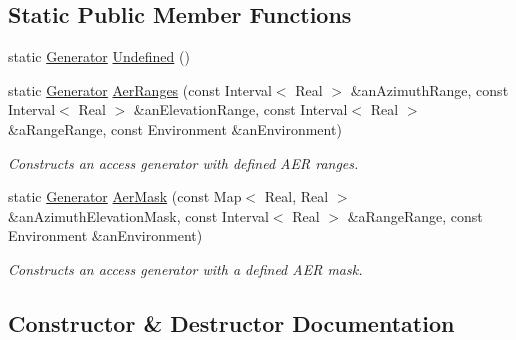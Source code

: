 \subsection*{Static Public Member Functions}
\begin{DoxyCompactItemize}
\item 
static \hyperlink{classostk_1_1astro_1_1access_1_1_generator}{Generator} \hyperlink{classostk_1_1astro_1_1access_1_1_generator_a1fb2dd3d88187da24482168337a23ade}{Undefined} ()
\item 
static \hyperlink{classostk_1_1astro_1_1access_1_1_generator}{Generator} \hyperlink{classostk_1_1astro_1_1access_1_1_generator_aececdcffcfea35feb07d9214752e6995}{Aer\+Ranges} (const Interval$<$ Real $>$ \&an\+Azimuth\+Range, const Interval$<$ Real $>$ \&an\+Elevation\+Range, const Interval$<$ Real $>$ \&a\+Range\+Range, const Environment \&an\+Environment)
\begin{DoxyCompactList}\small\item\em Constructs an access generator with defined A\+ER ranges. \end{DoxyCompactList}\item 
static \hyperlink{classostk_1_1astro_1_1access_1_1_generator}{Generator} \hyperlink{classostk_1_1astro_1_1access_1_1_generator_a023edbe897ad6db339dce2107821442f}{Aer\+Mask} (const Map$<$ Real, Real $>$ \&an\+Azimuth\+Elevation\+Mask, const Interval$<$ Real $>$ \&a\+Range\+Range, const Environment \&an\+Environment)
\begin{DoxyCompactList}\small\item\em Constructs an access generator with a defined A\+ER mask. \end{DoxyCompactList}\end{DoxyCompactItemize}


\subsection{Constructor \& Destructor Documentation}
\mbox{\label{classostk_1_1astro_1_1access_1_1_generator_a009da655bc3cc6232cd9986275cc5731}} 
